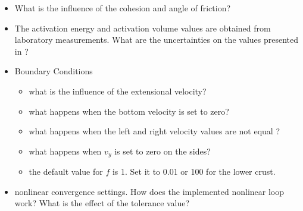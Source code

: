 \begin{itemize}
\item What is the influence of the cohesion and angle of friction? 
\item The activation energy and activation volume values are obtained from laboratory measurements. What are the uncertainties on the values presented in \cite{nabu15}?
\item Boundary Conditions 
\begin{itemize}
\item what is the influence of the extensional velocity?
\item what happens when the bottom velocity is set to zero?
\item what happens when the left and right velocity values are not equal ?
\item what happens when $v_y$ is set to zero on the sides?
\item the default value for $f$ is 1. Set it to 0.01 or 100 for the lower crust.
\end{itemize}



\item nonlinear convergence settings. How does the implemented nonlinear loop work? What is the effect of the tolerance value?

\end{itemize}

